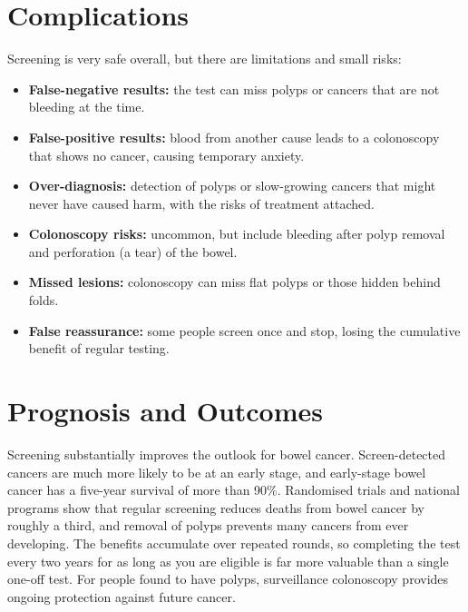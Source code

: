 \section*{Complications}
Screening is very safe overall, but there are limitations and small risks:
\begin{itemize}
    \item \textbf{False-negative results:} the test can miss polyps or cancers that are not bleeding at the time.
    \item \textbf{False-positive results:} blood from another cause leads to a colonoscopy that shows no cancer, causing temporary anxiety.
    \item \textbf{Over-diagnosis:} detection of polyps or slow-growing cancers that might never have caused harm, with the risks of treatment attached.
    \item \textbf{Colonoscopy risks:} uncommon, but include bleeding after polyp removal and perforation (a tear) of the bowel.
    \item \textbf{Missed lesions:} colonoscopy can miss flat polyps or those hidden behind folds.
    \item \textbf{False reassurance:} some people screen once and stop, losing the cumulative benefit of regular testing.
\end{itemize}

\section*{Prognosis and Outcomes}
Screening substantially improves the outlook for bowel cancer. Screen-detected cancers are much more likely to be at an early stage, and early-stage bowel cancer has a five-year survival of more than 90\%. Randomised trials and national programs show that regular screening reduces deaths from bowel cancer by roughly a third, and removal of polyps prevents many cancers from ever developing. The benefits accumulate over repeated rounds, so completing the test every two years for as long as you are eligible is far more valuable than a single one-off test. For people found to have polyps, surveillance colonoscopy provides ongoing protection against future cancer.

